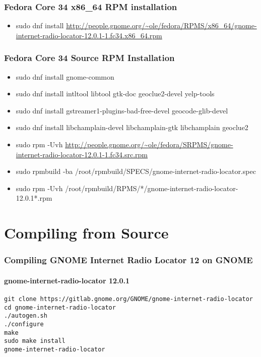 \documentclass[aspectratio=43]{beamer}
\begin{document}
\begin{frame}
\frametitle{Fedora Core 34 x86\_64 RPM installation}

    \begin{itemize}
        \item sudo dnf install \url{http://people.gnome.org/~ole/fedora/RPMS/x86\_64/gnome-internet-radio-locator-12.0.1-1.fc34.x86\_64.rpm}
    \end{itemize}

\end{frame}

\begin{frame}
\frametitle{Fedora Core 34 Source RPM Installation}

\begin{itemize}
        \item sudo dnf install gnome-common
        \item sudo dnf install intltool libtool gtk-doc geoclue2-devel yelp-tools
        \item sudo dnf install gstreamer1-plugins-bad-free-devel geocode-glib-devel
        \item sudo dnf install libchamplain-devel libchamplain-gtk libchamplain geoclue2
        \item sudo rpm -Uvh \url{http://people.gnome.org/~ole/fedora/SRPMS/gnome-internet-radio-locator-12.0.1-1.fc34.src.rpm}
        \item sudo rpmbuild -ba /root/rpmbuild/SPECS/gnome-internet-radio-locator.spec
        \item sudo rpm -Uvh /root/rpmbuild/RPMS/*/gnome-internet-radio-locator-12.0.1*.rpm
\end{itemize}
    
\end{frame}


\section{Compiling from Source}

\begin{frame}
\frametitle{Compiling GNOME Internet Radio Locator 12 on GNOME}
\framesubtitle{gnome-internet-radio-locator 12.0.1}

    \texttt{git clone https://gitlab.gnome.org/GNOME/gnome-internet-radio-locator\\
cd gnome-internet-radio-locator\\
./autogen.sh\\
./configure\\
make\\
sudo make install\\
gnome-internet-radio-locator}
\end{frame}
\end{document}

